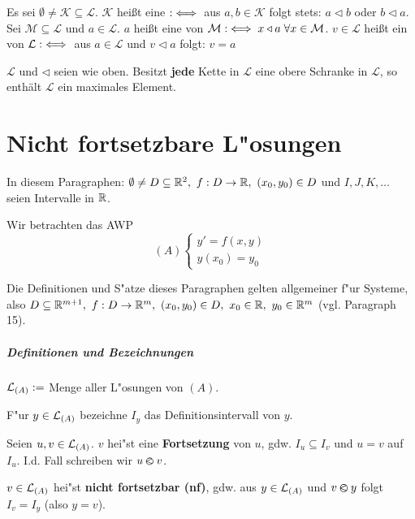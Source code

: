 \documentclass[a4paper,twoside,DIV15,BCOR12mm]{scrbook}
\begin{document}
Es sei $\emptyset \neq \mathcal{K} \subseteq \mathcal{L}$. $\mathcal{K}$ heißt eine  $:\iff$ aus $a, b \in \mathcal{K}$ folgt stets: $a \triangleleft b$ oder $b \triangleleft a$. Sei $\mathcal{M} \subseteq \mathcal{L}$ und $a \in \mathcal{L}$. $a$ heißt eine  von $\mathcal{M} :\iff x \triangleleft a \; \forall x \in \mathcal{M}$. $v \in \mathcal{L}$ heißt ein  von $\mathcal{L} :\iff$ aus $a \in \mathcal{L}$ und $v \triangleleft a$ folgt: $v = a$

\begin{lemma}
$\mathcal{L}$ und $\triangleleft$ seien wie oben. Besitzt \textbf{jede} Kette in $\mathcal{L}$ eine obere Schranke in $\mathcal{L}$, so enthält $\mathcal{L}$ ein maximales Element.
\end{lemma}


\setcounter{chapter}{21}
\chapter{Nicht fortsetzbare L"osungen}

In diesem Paragraphen: $\emptyset \ne D \subseteq \mathbb{R}^2,\ f:D\to\mathbb{R},\ (x_0,y_0) \in D$ und $I,J,K,\ldots$ seien Intervalle in $\mathbb{R}$.

Wir betrachten das AWP \[(A) \begin{cases} y' =f(x,y)\\ y(x_0) =y_0 \end{cases}\]

\begin{bemerkung}
Die Definitionen und S"atze dieses Paragraphen gelten allgemeiner f"ur Systeme, also $D \subseteq \MdR^{m+1},\ f:D\to\MdR^m,\ (x_0,y_0) \in D,\ x_0\in\MdR,\ y_0\in\MdR^m$ (vgl. Paragraph 15).
\end{bemerkung}

\paragraph{Definitionen und Bezeichnungen}
\begin{liste}
\item $\mathcal{L}_{(A)} := $ Menge aller L"osungen von $(A)$.
\item F"ur $y\in\mathcal{L}_{(A)}$ bezeichne $I_y$ das Definitionsintervall von $y$.
\item Seien $u,v \in \mathcal{L}_{(A)}$. $v$ hei"st eine \textbf{Fortsetzung} von $u$, gdw. $I_u \subseteq I_v$ und $u=v$ auf $I_u$. I.d. Fall schreiben wir $u\varolessthan v$.
\item $v \in \mathcal{L}_{(A)}$ hei"st \textbf{nicht fortsetzbar (nf)}, gdw. aus $y\in\mathcal{L}_{(A)}$ und $v\varolessthan y$ folgt $I_v=I_y$ (also $y=v$).
\end{liste}
\end{document}
